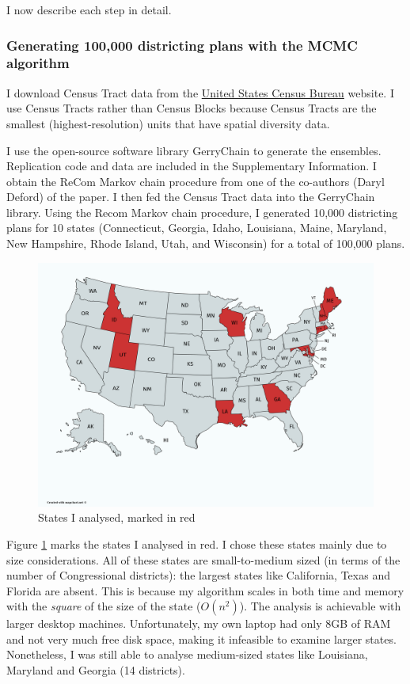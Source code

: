 \documentclass[]{article}
\begin{document}
I now describe each step in detail.

\hypertarget{generating-100000-districting-plans-with-the-mcmc-algorithm}{%
\subsubsection{Generating 100,000 districting plans with the MCMC
algorithm}\label{generating-100000-districting-plans-with-the-mcmc-algorithm}}

I download Census Tract data from the \href{census.gov}{United States
Census Bureau} website. I use Census Tracts rather than Census Blocks
because Census Tracts are the smallest (highest-resolution) units that
have spatial diversity data.

I use the open-source software library GerryChain to generate the
ensembles. Replication code and data are included in the Supplementary
Information. I obtain the ReCom Markov chain procedure from one of the
co-authors (Daryl Deford) of the \cite{ddj2019recom} paper. I then fed
the Census Tract data into the GerryChain library. Using the Recom
Markov chain procedure, I generated 10,000 districting plans for 10
states (Connecticut, Georgia, Idaho, Louisiana, Maine, Maryland, New
Hampshire, Rhode Island, Utah, and Wisconsin) for a total of 100,000
plans.

\begin{figure}
\centering
\includegraphics{./img/states_analysed.png}
\caption{States I analysed, marked in red \label{states_analysed}}
\end{figure}

Figure \ref{states_analysed} marks the states I analysed in red. I chose
these states mainly due to size considerations. All of these states are
small-to-medium sized (in terms of the number of Congressional
districts): the largest states like California, Texas and Florida are
absent. This is because my algorithm scales in both time and memory with
the \emph{square} of the size of the state (\(O(n^2)\)). The analysis is
achievable with larger desktop machines. Unfortunately, my own laptop
had only 8GB of RAM and not very much free disk space, making it
infeasible to examine larger states. Nonetheless, I was still able to
analyse medium-sized states like Louisiana, Maryland and Georgia (14
districts).
\end{document}
